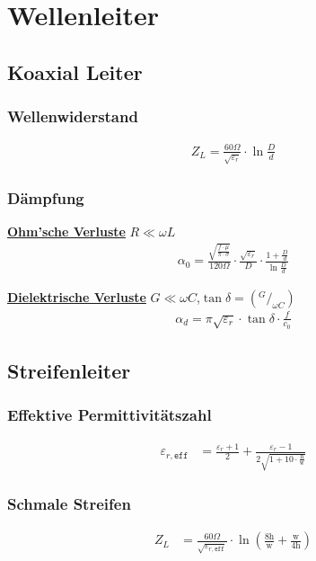 \section{Wellenleiter}
\subsection{Koaxial Leiter}
\subsubsection{Wellenwiderstand}


\begin{align*}
    Z_L = \frac{60\Omega}{\sqrt{\varepsilon_r}}\cdot \ln{\frac{D}{d}}
\end{align*}

\subsubsection{Dämpfung}
\underline{\textbf{Ohm'sche Verluste}} $R\ll\omega L$
\begin{align*}
    \alpha_0 = \frac{\sqrt{\frac{f\cdot\mu}{\pi\cdot\sigma}}}{120\Omega}\cdot\frac{\sqrt{\varepsilon_r}}{D}\cdot\frac{1+\frac{D}{d}}{\ln \frac{D}{d}}
\end{align*}

\underline{\textbf{Dielektrische Verluste}} $G\ll\omega C$,$\tan\delta= (^G/_{\omega C})$
\begin{align*}
    \alpha_d = \pi\sqrt{\varepsilon_r}\cdot\tan\delta\cdot\frac{f}{c_0}
\end{align*}

\subsection{Streifenleiter}


\subsubsection{Effektive Permittivitätszahl}
\begin{align*}
    \varepsilon_{r,\texttt{eff}} & = \frac{\varepsilon_r+1}{2}+\frac{\varepsilon_r-1}{2\sqrt{1+10\cdot\frac{\mathrm{h}}{\mathrm{w}}}}
\end{align*}
\subsubsection{Schmale Streifen}
\begin{align*}
    Z_L & = \frac{60\Omega}{\sqrt{\varepsilon_{r,\texttt{eff}}}}\cdot\ln\left(\frac{8\text{h}}{\text{w}}+\frac{\mathrm{w}}{4\mathrm{h}}\right)
\end{align*}
